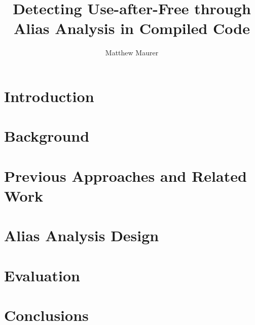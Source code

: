\documentclass[10pt,conference]{IEEEtran}
\begin{document}
\newcommand{\subheading}[1]{\textbf{#1.}}

\title{Detecting Use-after-Free through Alias Analysis in Compiled Code}
\author{Matthew Maurer}
\maketitle
\begin{abstract}
	
\end{abstract}
\section{Introduction}

\section{Background}


\section{Previous Approaches and Related Work}

\section{Alias Analysis Design}

\section{Evaluation}

\FloatBarrier
\section{Conclusions}




\end{document}
